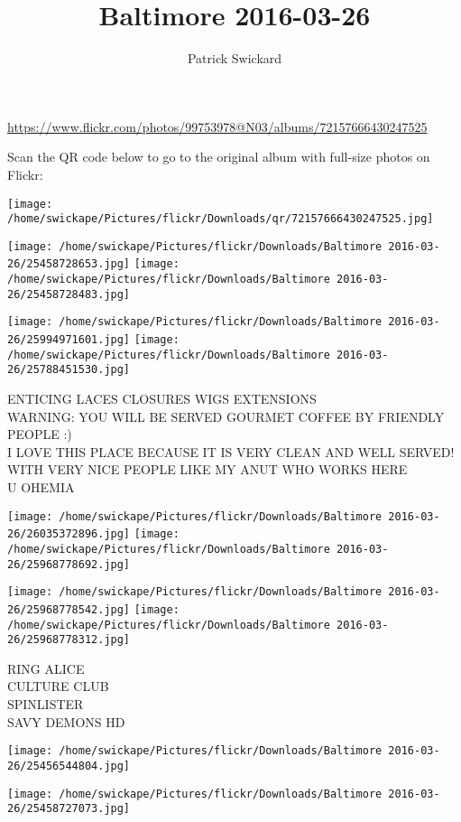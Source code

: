 \documentclass[10pt,letterpaper]{article}
\title{Baltimore 2016-03-26}
\author{Patrick Swickard}
\date{}
\begin{document}
\maketitle

\url{https://www.flickr.com/photos/99753978@N03/albums/72157666430247525}

Scan the QR code below to go to the original album with full-size photos on Flickr:

\texttt{[image: /home/swickape/Pictures/flickr/Downloads/qr/72157666430247525.jpg]}
\pagebreak

\texttt{[image: /home/swickape/Pictures/flickr/Downloads/Baltimore 2016-03-26/25458728653.jpg]}
\texttt{[image: /home/swickape/Pictures/flickr/Downloads/Baltimore 2016-03-26/25458728483.jpg]}

\texttt{[image: /home/swickape/Pictures/flickr/Downloads/Baltimore 2016-03-26/25994971601.jpg]}
\texttt{[image: /home/swickape/Pictures/flickr/Downloads/Baltimore 2016-03-26/25788451530.jpg]}

ENTICING LACES CLOSURES WIGS EXTENSIONS\\
WARNING: YOU WILL BE SERVED GOURMET COFFEE BY FRIENDLY PEOPLE :)\\
I LOVE THIS PLACE BECAUSE IT IS VERY CLEAN AND WELL SERVED!  WITH VERY NICE PEOPLE LIKE MY ANUT WHO WORKS HERE\\
U OHEMIA
\pagebreak

\texttt{[image: /home/swickape/Pictures/flickr/Downloads/Baltimore 2016-03-26/26035372896.jpg]}
\texttt{[image: /home/swickape/Pictures/flickr/Downloads/Baltimore 2016-03-26/25968778692.jpg]}

\texttt{[image: /home/swickape/Pictures/flickr/Downloads/Baltimore 2016-03-26/25968778542.jpg]}
\texttt{[image: /home/swickape/Pictures/flickr/Downloads/Baltimore 2016-03-26/25968778312.jpg]}

RING ALICE\\
CULTURE CLUB\\
SPINLISTER\\
SAVY DEMONS HD
\pagebreak

\texttt{[image: /home/swickape/Pictures/flickr/Downloads/Baltimore 2016-03-26/25456544804.jpg]}

\vspace{0.25in}
\texttt{[image: /home/swickape/Pictures/flickr/Downloads/Baltimore 2016-03-26/25458727073.jpg]}
\end{document}
